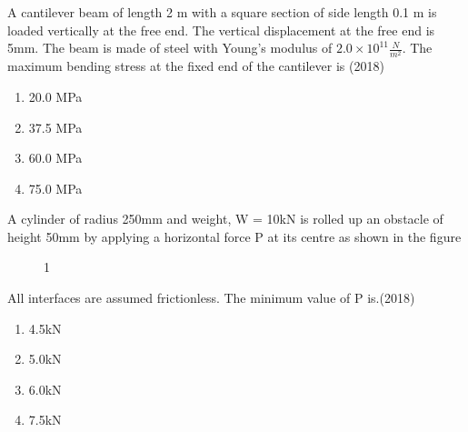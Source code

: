 
\iffalse
\chapter{2018}
\author{AI24BTECH11008}
\section{ce}
\fi

    \item A cantilever beam of length 2 m with a square section of side length 0.1 m is loaded vertically at the free end. The vertical displacement at the free end is 5mm. The beam is made of steel with Young's modulus of $2.0\times 10^{11}\frac{N}{m^2}$. The maximum bending stress at the fixed end of the cantilever is \hfill (2018)
    \begin{enumerate}[label=(\Alph*)]
        \item 20.0 MPa
        \item 37.5 MPa
        \item 60.0 MPa
        \item 75.0 MPa
    \end{enumerate}
    \item A cylinder of radius 250mm and weight, W = 10kN is rolled up an obstacle of height 50mm by applying a horizontal force P at its centre as shown in the figure
    \begin{figure}[!ht]
        \centering
        \caption{1}
    \end{figure}
    All interfaces are assumed frictionless. The minimum value of P is.\hfill (2018)
    \begin{enumerate}[label=(\Alph*)]
        \item 4.5kN
        \item 5.0kN
        \item 6.0kN
        \item 7.5kN
    \end{enumerate}
